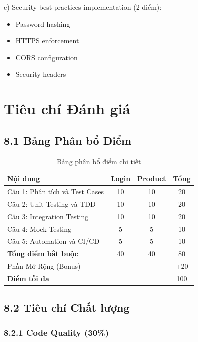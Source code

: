 \documentclass[a4paper,12pt]{article}
\begin{document}
c) Security best practices implementation (2 điểm):

\begin{itemize}
    \item Password hashing
    \item HTTPS enforcement
    \item CORS configuration
    \item Security headers
\end{itemize}

\section{Tiêu chí Đánh giá}

\subsection{8.1 Bảng Phân bổ Điểm}

\begin{table}[H]
\centering
\begin{tabular}{|l|c|c|c|}
\hline
\textbf{Nội dung} & \textbf{Login} & \textbf{Product} & \textbf{Tổng} \\ \hline
Câu 1: Phân tích và Test Cases & 10 & 10 & 20 \\ \hline
Câu 2: Unit Testing và TDD & 10 & 10 & 20 \\ \hline
Câu 3: Integration Testing & 10 & 10 & 20 \\ \hline
Câu 4: Mock Testing & 5 & 5 & 10 \\ \hline
Câu 5: Automation và CI/CD & 5 & 5 & 10 \\ \hline
\textbf{Tổng điểm bắt buộc} & 40 & 40 & 80 \\ \hline
Phần Mở Rộng (Bonus) & \multicolumn{2}{c|}{} & +20 \\ \hline
\textbf{Điểm tối đa} & \multicolumn{2}{c|}{} & 100 \\ \hline
\end{tabular}
\caption{Bảng phân bổ điểm chi tiết}
\end{table}

\subsection{8.2 Tiêu chí Chất lượng}

\subsubsection{8.2.1 Code Quality (30\%)}
\end{document}
